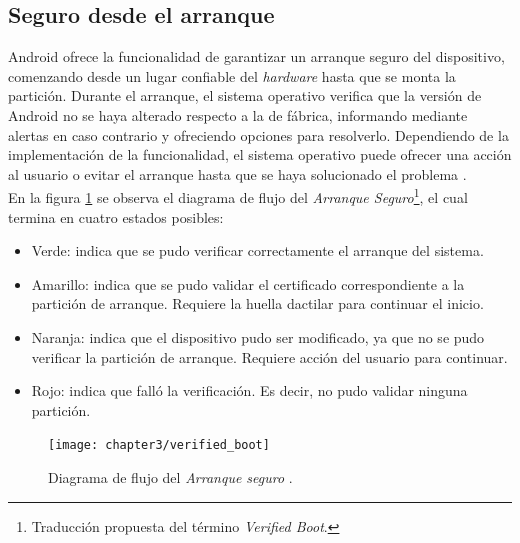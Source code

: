 \subsection{Seguro desde el arranque}
Android ofrece la funcionalidad de garantizar un arranque seguro del dispositivo, comenzando desde un lugar confiable del \textit{hardware} hasta que se monta la partición. Durante el arranque, el sistema operativo verifica que la versión de Android no se haya alterado respecto a la de fábrica, informando mediante alertas en caso contrario y ofreciendo opciones para resolverlo. Dependiendo de la implementación de la funcionalidad, el sistema operativo puede ofrecer una acción al usuario o evitar el arranque hasta que se haya solucionado el problema \cite{aossec}.\\
En la figura \ref{fig:ch03:verifyBoot} se observa el diagrama de flujo del \textit{Arranque Seguro}\footnote{Traducción propuesta del término \textit{Verified Boot}.}, el cual termina en cuatro estados posibles:
\begin{itemize}
	\item Verde: indica que se pudo verificar correctamente el arranque del sistema.
	\item Amarillo: indica que se pudo validar el certificado correspondiente a la partición de arranque. Requiere la huella dactilar para continuar el inicio.
	\item Naranja: indica que el dispositivo pudo ser modificado, ya que no se pudo verificar la partición de arranque. Requiere acción del usuario para continuar.
	\item Rojo: indica que falló la verificación. Es decir, no pudo validar ninguna partición.
\end{itemize}
\begin{figure}[hbtp]
	\begin{center}
		\texttt{[image: chapter3/verified\_boot]}
		\caption{Diagrama de flujo del \textit{Arranque seguro} \cite{asreview2015}.}
		\label{fig:ch03:verifyBoot}
	\end{center}
\end{figure}
